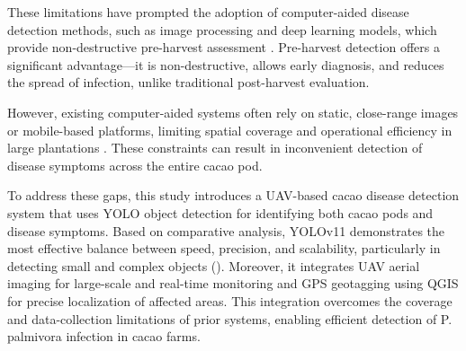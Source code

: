 These limitations have prompted the adoption of computer-aided disease detection methods, such as image processing and deep learning models, which provide non-destructive pre-harvest assessment \citep{Alvarado2023, Silva2024}. Pre-harvest detection offers a significant advantage—it is non-destructive, allows early diagnosis, and reduces the spread of infection, unlike traditional post-harvest evaluation.

However, existing computer-aided systems often rely on static, close-range images or mobile-based platforms, limiting spatial coverage and operational efficiency in large plantations \citep{BaculioBarbosa2022, Tan2018}. These constraints can result in inconvenient detection of disease symptoms across the entire cacao pod.

To address these gaps, this study introduces a UAV-based cacao disease detection system that uses YOLO object detection for identifying both cacao pods and disease symptoms. Based on comparative analysis, YOLOv11 demonstrates the most effective balance between speed, precision, and scalability, particularly in detecting small and complex objects (\citep{UltralyticsBlog2025}). Moreover, it integrates UAV aerial imaging for large-scale and real-time monitoring and GPS geotagging using QGIS for precise localization of affected areas. This integration overcomes the coverage and data-collection limitations of prior systems, enabling efficient detection of P. palmivora infection in cacao farms.

